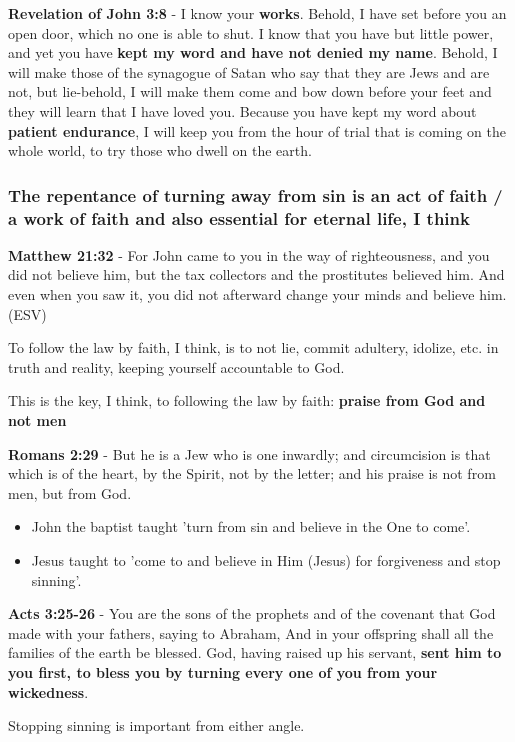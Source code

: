 \documentclass[11pt]{article}
\begin{document}
\textbf{Revelation of John 3:8} - I know your \textbf{works}. Behold, I have set before you an open door, which no one is able to shut. I know that you have but little power, and yet you have \textbf{kept my word and have not denied my name}. Behold, I will make those of the synagogue of Satan who say that they are Jews and are not, but lie-behold, I will make them come and bow down before your feet and they will learn that I have loved you. Because you have kept my word about \textbf{patient endurance}, I will keep you from the hour of trial that is coming on the whole world, to try those who dwell on the earth.

\subsubsection{The repentance of turning away from sin is an act of faith / a work of faith and also essential for eternal life, I think}
\label{sec:orga0305f7}
\textbf{Matthew 21:32} - For John came to you in the way of righteousness, and you did not believe him, but the tax collectors and the prostitutes believed him. And even when you saw it, you did not afterward change your minds and believe him. (ESV)

To follow the law by faith, I think, is to not lie, commit adultery, idolize, etc. in truth and reality, keeping yourself accountable to God.

This is the key, I think, to following the law by faith: \textbf{praise from God and not men}

\textbf{Romans 2:29} - But he is a Jew who is one inwardly; and circumcision is that which is of the heart, by the Spirit, not by the letter; and his praise is not from men, but from God.

\begin{itemize}
\item John the baptist taught 'turn from sin and believe in the One to come'.
\item Jesus taught to 'come to and believe in Him (Jesus) for forgiveness and stop sinning'.
\end{itemize}

\textbf{Acts 3:25-26} - You are the sons of the prophets and of the covenant that God made with your fathers, saying to Abraham, And in your offspring shall all the families of the earth be blessed. God, having raised up his servant, \textbf{sent him to you first, to bless you by turning every one of you from your wickedness}.

Stopping sinning is important from either angle.
\end{document}

